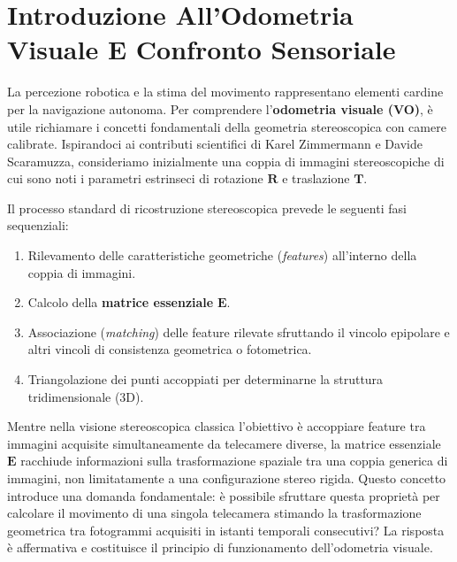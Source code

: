 ﻿\documentclass[11pt, a4paper]{article}
\author{Francesco Lo Verde}
\begin{document}

\section{Introduzione All'Odometria Visuale E Confronto Sensoriale}

La percezione robotica e la stima del movimento rappresentano elementi cardine per la navigazione autonoma. Per comprendere l'\textbf{odometria visuale (VO)}, è utile richiamare i concetti fondamentali della geometria stereoscopica con camere calibrate. Ispirandoci ai contributi scientifici di Karel Zimmermann e Davide Scaramuzza, consideriamo inizialmente una coppia di immagini stereoscopiche di cui sono noti i parametri estrinseci di rotazione $\bm{R}$ e traslazione $\bm{T}$.


Il processo standard di ricostruzione stereoscopica prevede le seguenti fasi sequenziali:
\begin{enumerate}
    \item Rilevamento delle caratteristiche geometriche (\emph{features}) all'interno della coppia di immagini.
    \item Calcolo della \textbf{matrice essenziale} $\bm{E}$.
    \item Associazione (\emph{matching}) delle feature rilevate sfruttando il vincolo epipolare e altri vincoli di consistenza geometrica o fotometrica.
    \item Triangolazione dei punti accoppiati per determinarne la struttura tridimensionale (3D).
\end{enumerate}

Mentre nella visione stereoscopica classica l'obiettivo è accoppiare feature tra immagini acquisite simultaneamente da telecamere diverse, la matrice essenziale $\bm{E}$ racchiude informazioni sulla trasformazione spaziale tra una coppia generica di immagini, non limitatamente a una configurazione stereo rigida. Questo concetto introduce una domanda fondamentale: è possibile sfruttare questa proprietà per calcolare il movimento di una singola telecamera stimando la trasformazione geometrica tra fotogrammi acquisiti in istanti temporali consecutivi? La risposta è affermativa e costituisce il principio di funzionamento dell'odometria visuale.
\end{document}
